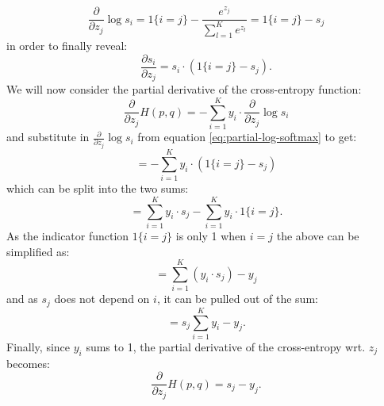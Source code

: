 \documentclass[a4paper,11pt]{article} %
\begin{document}
\begin{equation} \label{eq:partial-log-softmax}
  \frac{\partial}{\partial z_j} \log s_i = 1\{ i = j \} - \frac{e^{z_j}}{\sum_{l=1}^{K}{ e^{z_l}}} = 1\{ i = j \} - s_j
\end{equation}
in order to finally reveal:
\begin{equation}
  \frac{\partial s_i}{\partial z_j} = s_i \cdot \left( 1\{ i = j \} - s_j \right).
\end{equation}
We will now consider the partial derivative of the cross-entropy function:
\begin{equation}
  \frac{\partial}{\partial z_j} H(p, q) = - \sum_{i=1}^{K} y_{i} \cdot \frac{\partial}{\partial z_j} \log s_i
\end{equation}
and substitute in $\frac{\partial}{\partial z_j} \log s_i$ from equation \ref{eq:partial-log-softmax} to get:
\begin{equation}
  = - \sum_{i=1}^{K} y_{i} \cdot \left( 1\{ i = j \} - s_j \right)
\end{equation}
which can be split into the two sums:
\begin{equation}
  = \sum_{i=1}^{K}{y_{i} \cdot s_j} - \sum_{i=1}^{K}{y_{i} \cdot 1\{ i = j \}}.
\end{equation}
As the indicator function $1\{i=j\}$ is only 1 when $i=j$ the above can be simplified as:
\begin{equation}
  = \sum_{i=1}^{K}{\left( y_{i} \cdot s_j \right)} - y_{j}
\end{equation}
and as $s_j$ does not depend on $i$, it can be pulled out of the sum:
\begin{equation}
  = s_j \sum_{i=1}^{K}{ y_{i} } - y_{j}.
\end{equation}
Finally, since $y_i$ sums to 1, the partial derivative of the cross-entropy wrt. $z_j$ becomes:
\begin{equation}
  \frac{\partial}{\partial z_j} H(p, q) = s_j - y_j.
\end{equation}

\end{document}
